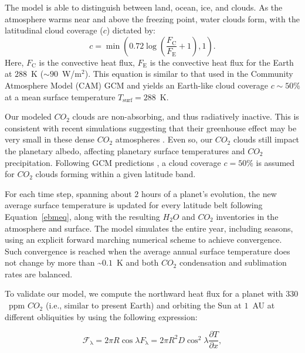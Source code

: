 \documentclass[fleqn,usenatbib]{mnras}
\begin{document}
The model is able to distinguish between land, ocean, ice, and clouds. As the atmosphere warms near and above the freezing point, water clouds form, with the latitudinal cloud coverage ($c$) dictated by:
\begin{equation}
\label{cloud_coverage}
    c = \min \left ( 0.72 \log \left( \frac{F_{\mathrm{C}}}{F_{\mathrm{E}}} + 1 \right ),1 \right ).
\end{equation}
Here, $F_\mathrm{C}$ is the convective heat flux, $F_\mathrm{E}$ is the convective heat flux for the Earth at $288$~K ($\sim 90$~W/m$^2$). This equation is similar to that used in the Community Atmosphere Model (CAM) GCM \citep{xu1991, yang2014} and yields an Earth-like cloud coverage $c\sim 50 \%$ at a mean surface temperature $T_{\mathrm{surf}}=288$~K. 

Our modeled $CO_{\mathrm{2}}$ clouds are non-absorbing, and thus radiatively inactive. This is consistent with recent simulations suggesting that their greenhouse effect may be very small in these dense $CO_{\mathrm{2}}$ atmospheres \citep{kitzmann2016}. Even so, our $CO_{\mathrm{2}}$ clouds still impact the planetary albedo, affecting planetary surface temperatures and $CO_{\mathrm{2}}$ precipitation. Following GCM predictions \citep{forget2013}, a cloud coverage $c=50 \%$ is assumed for $CO_{\mathrm{2}}$ clouds forming within a given latitude band. 

For each time step, spanning about $2$ hours of a planet's evolution, the new average surface temperature is updated for every latitude belt following Equation~\ref{ebmeq}, along with the resulting $H_{\mathrm{2}}O$ and $CO_{\mathrm{2}}$ inventories in the atmosphere and surface. The model simulates the entire year, including seasons, using an explicit forward marching numerical scheme to achieve convergence. Such convergence is reached when the average annual surface temperature does not change by more than \textasciitilde$0.1$~K and both $CO_{\mathrm{2}}$ condensation and sublimation rates are balanced. 

To validate our model, we compute the northward heat flux for a planet with $330$~ppm $CO_{\mathrm{2}}$ (i.e., similar to present Earth) and orbiting the Sun at $1$~AU at different obliquities by using the following expression:

\begin{equation}
    \mathcal{F}_{\mathrm{\lambda}}=2 \pi R \cos \lambda F_{\mathrm{\lambda}}=2 \pi R^{2} D \cos ^{2} \lambda \frac{\partial T}{\partial x},
\end{equation}
\end{document}
